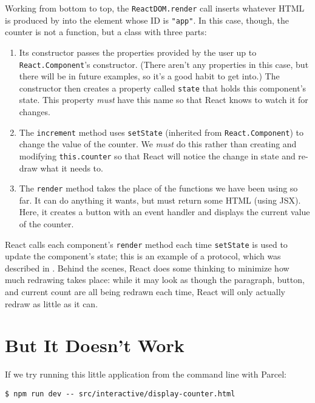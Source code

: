 Working from bottom to top,
the \texttt{ReactDOM.render} call inserts whatever HTML is produced by \texttt{}
into the element whose ID is \texttt{"app"}.
In this case,
though,
the counter is not a function,
but a class with three parts:

\begin{enumerate}
\item
  Its constructor passes the properties provided by the user up to \texttt{React.Component}'s constructor.
  (There aren't any properties in this case,
  but there will be in future examples,
  so it's a good habit to get into.)
  The constructor then creates a property called \texttt{state}
  that holds this component's state.
  This property \emph{must} have this name so that React knows to watch it for changes.
\item
  The \texttt{increment} method uses \texttt{setState} (inherited from \texttt{React.Component})
  to change the value of the counter.
  We \emph{must} do this rather than creating and modifying \texttt{this.counter}
  so that React will notice the change in state
  and re-draw what it needs to.
\item
  The \texttt{render} method takes the place of the functions we have been using so far.
  It can do anything it wants, but must return some HTML (using JSX).
  Here, it creates a button with an event handler and displays the current value of the counter.
\end{enumerate}

React calls each component's \texttt{render} method each time \texttt{setState} is used to update the component's state;
this is an example of a protocol,
which was described in .
Behind the scenes,
React does some thinking to minimize how much redrawing takes place:
while it may look as though the paragraph, button, and current count are all being redrawn each time,
React will only actually redraw as little as it can.

\section{But It Doesn't Work}\label{s:interactive-babel}

If we try running this little application from the command line with Parcel:

\begin{verbatim}
$ npm run dev -- src/interactive/display-counter.html
\end{verbatim}

